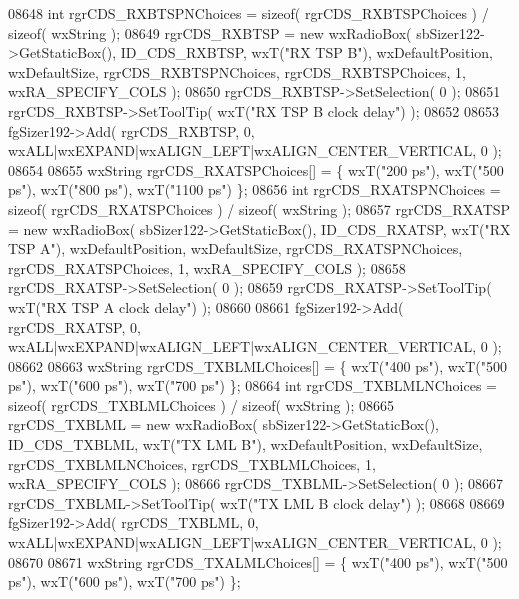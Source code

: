 \begin{DoxyCode}
08648     \textcolor{keywordtype}{int} rgrCDS\_RXBTSPNChoices = \textcolor{keyword}{sizeof}( rgrCDS\_RXBTSPChoices ) / \textcolor{keyword}{sizeof}( wxString );
08649     rgrCDS_RXBTSP = \textcolor{keyword}{new} wxRadioBox( sbSizer122->GetStaticBox(), ID_CDS_RXBTSP, wxT(\textcolor{stringliteral}{"RX TSP B"}), 
      wxDefaultPosition, wxDefaultSize, rgrCDS\_RXBTSPNChoices, rgrCDS\_RXBTSPChoices, 1, wxRA\_SPECIFY\_COLS );
08650     rgrCDS_RXBTSP->SetSelection( 0 );
08651     rgrCDS_RXBTSP->SetToolTip( wxT(\textcolor{stringliteral}{"RX TSP B clock delay"}) );
08652     
08653     fgSizer192->Add( rgrCDS_RXBTSP, 0, wxALL|wxEXPAND|wxALIGN\_LEFT|wxALIGN\_CENTER\_VERTICAL, 0 );
08654     
08655     wxString rgrCDS\_RXATSPChoices[] = \{ wxT(\textcolor{stringliteral}{"200 ps"}), wxT(\textcolor{stringliteral}{"500 ps"}), wxT(\textcolor{stringliteral}{"800 ps"}), wxT(\textcolor{stringliteral}{"1100 ps"}) \};
08656     \textcolor{keywordtype}{int} rgrCDS\_RXATSPNChoices = \textcolor{keyword}{sizeof}( rgrCDS\_RXATSPChoices ) / \textcolor{keyword}{sizeof}( wxString );
08657     rgrCDS_RXATSP = \textcolor{keyword}{new} wxRadioBox( sbSizer122->GetStaticBox(), ID_CDS_RXATSP, wxT(\textcolor{stringliteral}{"RX TSP A"}), 
      wxDefaultPosition, wxDefaultSize, rgrCDS\_RXATSPNChoices, rgrCDS\_RXATSPChoices, 1, wxRA\_SPECIFY\_COLS );
08658     rgrCDS_RXATSP->SetSelection( 0 );
08659     rgrCDS_RXATSP->SetToolTip( wxT(\textcolor{stringliteral}{"RX TSP A clock delay"}) );
08660     
08661     fgSizer192->Add( rgrCDS_RXATSP, 0, wxALL|wxEXPAND|wxALIGN\_LEFT|wxALIGN\_CENTER\_VERTICAL, 0 );
08662     
08663     wxString rgrCDS\_TXBLMLChoices[] = \{ wxT(\textcolor{stringliteral}{"400 ps"}), wxT(\textcolor{stringliteral}{"500 ps"}), wxT(\textcolor{stringliteral}{"600 ps"}), wxT(\textcolor{stringliteral}{"700 ps"}) \};
08664     \textcolor{keywordtype}{int} rgrCDS\_TXBLMLNChoices = \textcolor{keyword}{sizeof}( rgrCDS\_TXBLMLChoices ) / \textcolor{keyword}{sizeof}( wxString );
08665     rgrCDS_TXBLML = \textcolor{keyword}{new} wxRadioBox( sbSizer122->GetStaticBox(), ID_CDS_TXBLML, wxT(\textcolor{stringliteral}{"TX LML B"}), 
      wxDefaultPosition, wxDefaultSize, rgrCDS\_TXBLMLNChoices, rgrCDS\_TXBLMLChoices, 1, wxRA\_SPECIFY\_COLS );
08666     rgrCDS_TXBLML->SetSelection( 0 );
08667     rgrCDS_TXBLML->SetToolTip( wxT(\textcolor{stringliteral}{"TX LML B clock delay"}) );
08668     
08669     fgSizer192->Add( rgrCDS_TXBLML, 0, wxALL|wxEXPAND|wxALIGN\_LEFT|wxALIGN\_CENTER\_VERTICAL, 0 );
08670     
08671     wxString rgrCDS\_TXALMLChoices[] = \{ wxT(\textcolor{stringliteral}{"400 ps"}), wxT(\textcolor{stringliteral}{"500 ps"}), wxT(\textcolor{stringliteral}{"600 ps"}), wxT(\textcolor{stringliteral}{"700 ps"}) \};

\end{DoxyCode}
